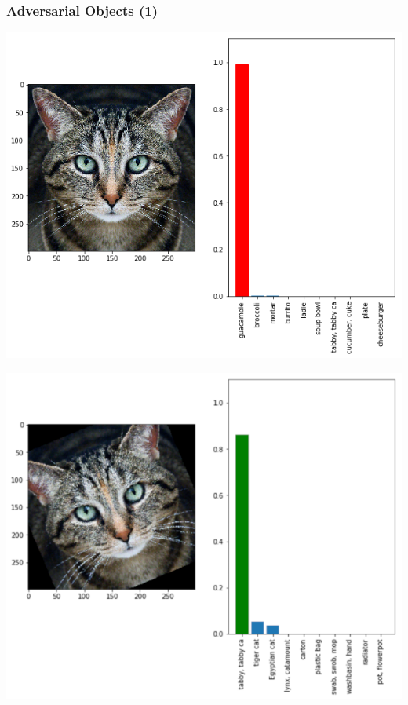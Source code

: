 \documentclass[aspectratio=169,x11names]{beamer}
\begin{document}
\begin{frame}
\frametitle{Adversarial Objects (1)}
\begin{minipage}{0.45\textwidth}
\begin{center}
\includegraphics[height=0.7\paperheight,keepaspectratio]{images/cat_adversarial}
\end{center}
\end{minipage}
\pause
\begin{minipage}{0.45\textwidth}
\begin{center}
\includegraphics[height=0.7\paperheight,keepaspectratio]{images/cat_rotated}
\end{center}
\end{minipage}
\end{frame}
\end{document}
